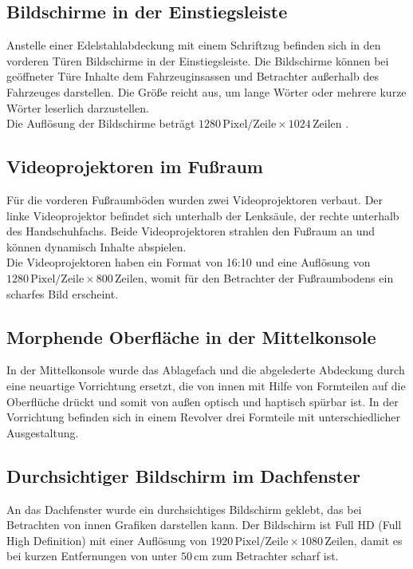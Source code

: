 \subsection{Bildschirme in der Einstiegsleiste}
Anstelle einer Edelstahlabdeckung mit einem Schriftzug befinden sich in den vorderen Türen Bildschirme in der Einstiegsleiste. Die Bildschirme können bei geöffneter Türe Inhalte dem Fahrzeuginsassen und Betrachter außerhalb des Fahrzeuges darstellen. Die Größe reicht aus, um lange Wörter oder mehrere kurze Wörter leserlich darzustellen. \\
Die Auflösung der Bildschirme beträgt $ 1280 \,\mathrm{Pixel}/\mathrm{Zeile} \times 1024 \,\mathrm{Zeilen} $ . 
\subsection{Videoprojektoren im Fußraum}
Für die vorderen Fußraumböden wurden zwei Videoprojektoren verbaut. Der linke Videoprojektor befindet sich unterhalb der Lenksäule, der rechte unterhalb des Handschuhfachs. Beide Videoprojektoren strahlen den Fußraum an und können dynamisch Inhalte abspielen. \\
Die Videoprojektoren haben ein Format von 16:10 und eine Auflösung von $ 1280\,\mathrm{Pixel}/\mathrm{Zeile} \times 800\,\mathrm{Zeilen} $, womit für den Betrachter der Fußraumbodens ein scharfes Bild erscheint.
\subsection{Morphende Oberfläche in der Mittelkonsole}
In der Mittelkonsole wurde das Ablagefach und die abgelederte Abdeckung durch eine neuartige Vorrichtung ersetzt, die von innen mit Hilfe von Formteilen auf die Oberflüche drückt und somit von außen optisch und haptisch spürbar ist. In der Vorrichtung befinden sich in einem Revolver drei Formteile mit unterschiedlicher Ausgestaltung.
\subsection{Durchsichtiger Bildschirm im Dachfenster}
An das Dachfenster wurde ein durchsichtiges Bildschirm geklebt, das bei Betrachten von innen Grafiken darstellen kann.
Der Bildschirm ist Full HD (Full High Definition) mit einer Auflösung von $ 1920 \,\mathrm{Pixel}/\mathrm{Zeile} \times 1080 \,\mathrm{Zeilen} $, damit es bei kurzen Entfernungen von unter $ 50\,\mathrm{cm} $ zum Betrachter scharf ist.
